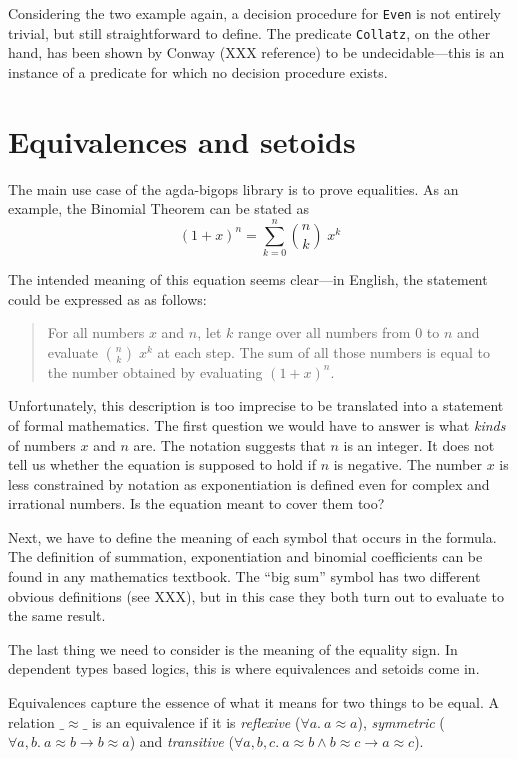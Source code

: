 Considering the two example again, a decision procedure for \texttt{Even} is not entirely trivial, but still straightforward to define. The predicate \texttt{Collatz}, on the other hand, has been shown by Conway (XXX reference) to be undecidable---this is an instance of a predicate for which no decision procedure exists.

\section{Equivalences and setoids}

The main use case of the agda-bigops library is to prove equalities. As an example, the Binomial Theorem can be stated as \[ (1 + x)^n = \sum_{k = 0}^n \binom{n}{k} \; x^k \]

The intended meaning of this equation seems clear---in English, the statement could be expressed as as follows: \begin{quote}For all numbers \(x\) and \(n\), let \(k\) range over all numbers from \(0\) to \(n\) and evaluate \(\binom{n}{k} \; x^k\) at each step. The sum of all those numbers is equal to the number obtained by evaluating \((1 + x)^n\).\end{quote}

Unfortunately, this description is too imprecise to be translated into a statement of formal mathematics. The first question we would have to answer is what \emph{kinds} of numbers \(x\) and \(n\) are. The notation suggests that \(n\) is an integer. It does not tell us whether the equation is supposed to hold if \(n\) is negative. The number \(x\) is less constrained by notation as exponentiation is defined even for complex and irrational numbers. Is the equation meant to cover them too?

Next, we have to define the meaning of each symbol that occurs in the formula. The definition of summation, exponentiation and binomial coefficients can be found in any mathematics textbook. The \enquote{big sum} symbol has two different obvious definitions (see XXX), but in this case they both turn out to evaluate to the same result.

The last thing we need to consider is the meaning of the equality sign. In dependent types based logics, this is where equivalences and setoids come in.


Equivalences capture the essence of what it means for two things to be equal. A relation \(\_\!\!\approx\!\!\_\) is an equivalence if it is \emph{reflexive} (\(\forall a.\ a \approx a\)), \emph{symmetric} (\(\forall a,b.\ a \approx b \rightarrow b \approx a\)) and \emph{transitive} (\(\forall a,b,c.\ a \approx b \wedge b \approx c \rightarrow a \approx c\)).

